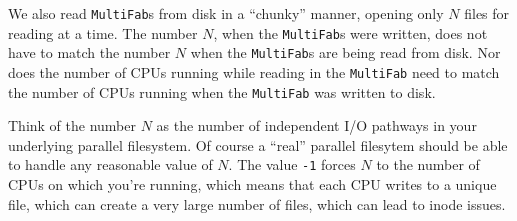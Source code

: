 We also read {\tt MultiFab}s from disk in a ``chunky'' manner, opening only $N$
files for reading at a time.  The number $N$, when the {\tt MultiFab}s were
written, does not have to match the number $N$ when the {\tt MultiFab}s are
being read from disk.  Nor does the number of CPUs running while
reading in the {\tt MultiFab} need to match the number of CPUs running when
the {\tt MultiFab} was written to disk.

Think of the number $N$ as the number of independent I/O pathways in
your underlying parallel filesystem.  Of course a ``real'' parallel
filesytem should be able to handle any reasonable value of $N$.  The
value {\tt -1} forces $N$ to the number of CPUs on which you're
running, which means that each CPU writes to a unique file, which can
create a very large number of files, which can lead to inode issues.


